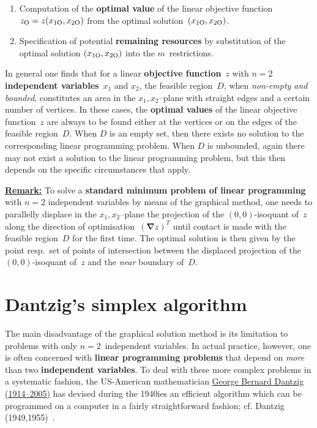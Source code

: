 \begin{enumerate}
\item Computation of the {\bf optimal value} of the linear objective function~$z_{{\rm O}}=z(x_{1{\rm O}},x_{2{\rm O}})$ from the optimal solution~$(x_{1{\rm O}}, x_{2{\rm O}})$.

\item Specification of potential {\bf remaining resources} by substitution of the optimal solution $(x_{1{\rm O}}, x_{2{\rm O}})$ into the $m$~restrictions.

\end{enumerate}
%
In general one finds that for a linear {\bf objective 
function}~$z$ with $n=2$ {\bf independent variables}~$x_{1}$ and 
$x_{2}$, the feasible region~$D$, when \emph{non-empty and 
bounded}, constitutes an area in the $x_{1},x_{2}$--plane with 
straight edges and a certain number of vertices. In these cases, 
the {\bf optimal values} of the linear objective function~$z$ are 
always to be found either at the vertices or on the edges of the 
feasible region~$D$. When $D$ is an empty set, then there exists 
no solution to the corresponding linear programming problem. When 
$D$ is unbounded, again there may not exist a solution to the 
linear programming problem, but this then depends on the specific 
circumstances that apply.

\medskip
\noindent
\underline{\bf Remark:} To solve a {\bf standard minimum problem 
of linear programming} with $n=2$ independent variables by means 
of the graphical method, one needs to parallelly displace in the 
$x_{1},x_{2}$--plane the projection of the $(0,0)$-isoquant of~$z$ 
along the direction of optimisation~$(\boldsymbol{\nabla} z)^{T}$ 
until contact is made with the feasible region~$D$ for the first 
time. The optimal solution is then given by the point resp.~set of 
points of intersection between the displaced projection of the 
$(0,0)$-isoquant of~$z$ and the \emph{near} boundary of~$D$.

\section[Dantzig's simplex algorithm]%
{Dantzig's simplex algorithm}
The main disadvantage of the graphical solution method is its 
limitation to problems with only $n=2$~independent variables. In 
actual practice, however, one is often concerned with {\bf linear 
programming problems} that depend on \emph{more} than two {\bf 
independent variables}. To deal with these more complex problems 
in a systematic fashion, the US-American mathematician 
\href{http://www-groups.dcs.st-and.ac.uk/~history/Biographies/Dantzig_George.html}{George
Bernard Dantzig (1914--2005)} has devised during the 1940ies an 
efficient algorithm which can be programmed on a computer in a 
fairly straightforward fashion; cf. Dantzig 
(1949,1955)~.

